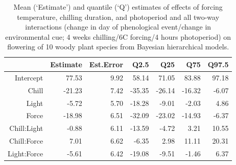\documentclass{article}\usepackage[]{graphicx}\usepackage[]{color}
\begin{document}
\begin{table}[ht]
\centering
\begin{tabular}{rrrrrrr}
  \hline
 & Estimate & Est.Error & Q2.5 & Q25 & Q75 & Q97.5 \\ 
  \hline
Intercept & 77.53 & 9.92 & 58.14 & 71.05 & 83.88 & 97.18 \\ 
  Chill & -21.23 & 7.42 & -35.35 & -26.14 & -16.32 & -6.07 \\ 
  Light & -5.72 & 5.70 & -18.28 & -9.01 & -2.03 & 4.86 \\ 
  Force & -18.98 & 6.51 & -32.09 & -23.02 & -14.93 & -6.37 \\ 
  Chill:Light & -0.88 & 6.11 & -13.59 & -4.72 & 3.21 & 10.55 \\ 
  Chill:Force & 7.01 & 6.62 & -6.35 & 2.98 & 11.11 & 20.31 \\ 
  Light:Force & -5.61 & 6.42 & -19.08 & -9.51 & -1.46 & 6.37 \\ 
   \hline
\end{tabular}
\caption{Mean (`Estimate') and quantile (`Q') estimates of effects of forcing temperature, chilling duration, and photoperiod and all two-way interactions (change in day of phenological event/change in environmental cue; 4 weeks chilling/6\degree C forcing/4 hours photoperiod) on flowering of 10 woody plant species from Bayesian hierarchical models.}
\label{tab:modelests2}
\end{table}
\end{document}

